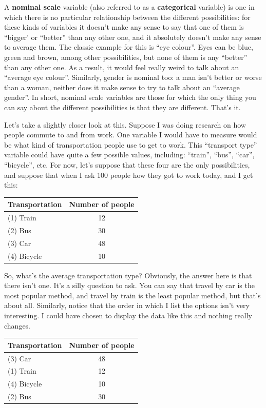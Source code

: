 \documentclass[
]{book}
\begin{document}
A \textbf{nominal scale} variable (also referred to as a \textbf{categorical} variable) is one in which there is no particular relationship between the different possibilities: for these kinds of variables it doesn't make any sense to say that one of them is ``bigger' or ``better'' than any other one, and it absolutely doesn't make any sense to average them. The classic example for this is ``eye colour''. Eyes can be blue, green and brown, among other possibilities, but none of them is any ``better'' than any other one. As a result, it would feel really weird to talk about an ``average eye colour''. Similarly, gender is nominal too: a man isn't better or worse than a woman, neither does it make sense to try to talk about an ``average gender''. In short, nominal scale variables are those for which the only thing you can say about the different possibilities is that they are different. That's it.

Let's take a slightly closer look at this. Suppose I was doing research on how people commute to and from work. One variable I would have to measure would be what kind of transportation people use to get to work. This ``transport type'' variable could have quite a few possible values, including: ``train'', ``bus'', ``car'', ``bicycle'', etc. For now, let's suppose that these four are the only possibilities, and suppose that when I ask 100 people how they got to work today, and I get this:

\begin{longtable}[]{@{}lc@{}}
\toprule\noalign{}
Transportation & Number of people \\
\midrule\noalign{}
\endhead
\bottomrule\noalign{}
\endlastfoot
(1) Train & 12 \\
(2) Bus & 30 \\
(3) Car & 48 \\
(4) Bicycle & 10 \\
\end{longtable}

So, what's the average transportation type? Obviously, the answer here is that there isn't one. It's a silly question to ask. You can say that travel by car is the most popular method, and travel by train is the least popular method, but that's about all. Similarly, notice that the order in which I list the options isn't very interesting. I could have chosen to display the data like this and nothing really changes.

\begin{longtable}[]{@{}lc@{}}
\toprule\noalign{}
Transportation & Number of people \\
\midrule\noalign{}
\endhead
\bottomrule\noalign{}
\endlastfoot
(3) Car & 48 \\
(1) Train & 12 \\
(4) Bicycle & 10 \\
(2) Bus & 30 \\
\end{longtable}
\end{document}
